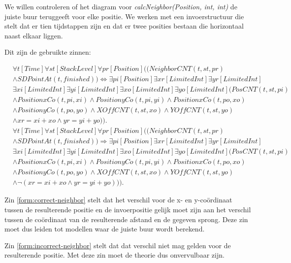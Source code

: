 We willen controleren of het diagram voor \textit{calcNeighbor(Position, int, int)} de juiste buur teruggeeft voor elke positie. We werken met een invoerstructuur die stelt dat er tien tijdstappen zijn en dat er twee posities bestaan die horizontaal naast elkaar liggen.

Dit zijn de gebruikte zinnen:

\begin{align}
	\nonumber&\forall{t}[Time]\forall{st}[StackLevel]\forall{pr}[Position]((NeighborCNT(t, st, pr) \\ \nonumber &\land SDPointAt(t, finished)) \Leftrightarrow \exists{pi}[Position]\exists{xr}[LimitedInt]\exists{yr}[LimitedInt]\\ \nonumber &\exists{xi}[LimitedInt]\exists{yi}[LimitedInt]\exists{xo}[LimitedInt]\exists{yo}[LimitedInt](PosCNT(t, st, pi) \\ \nonumber &\land PositionxCo(t, pi, xi) \land PositionyCo(t, pi, yi) \land PositionxCo(t, po, xo) \\ \nonumber &\land PositionyCo(t, po, yo) \land XOffCNT(t, st, xo) \land YOffCNT(t, st, yo) \\ &\land xr = xi + xo \land yr = yi + yo)).\label{form:correct-neighbor} \\
	\nonumber&\forall{t}[Time]\forall{st}[StackLevel]\forall{pr}[Position]((NeighborCNT(t, st, pr) \\ \nonumber &\land SDPointAt(t, finished)) \Rightarrow \exists{pi}[Position]\exists{xr}[LimitedInt]\exists{yr}[LimitedInt]\\ \nonumber &\exists{xi}[LimitedInt]\exists{yi}[LimitedInt]\exists{xo}[LimitedInt]\exists{yo}[LimitedInt](PosCNT(t, st, pi) \\ \nonumber &\land PositionxCo(t, pi, xi) \land PositionyCo(t, pi, yi) \land PositionxCo(t, po, xo) \\ \nonumber &\land PositionyCo(t, po, yo) \land XOffCNT(t, st, xo) \land YOffCNT(t, st, yo) \\ &\land \lnot{}(xr = xi + xo \land yr = yi + yo))).\label{form:incorrect-neighbor}
\end{align} 

Zin \ref{form:correct-neighbor} stelt dat het verschil voor de x- en y-co\"ordinaat tussen de resulterende positie en de invoerpositie gelijk moet zijn aan het verschil tussen de co\"ordinaat van de resulterende afstand en de gegeven sprong. Deze zin moet dus leiden tot modellen waar de juiste buur wordt berekend.

Zin \ref{form:incorrect-neighbor} stelt dat dat verschil niet mag gelden voor de resulterende positie. Met deze zin moet de theorie dus onvervulbaar zijn.

